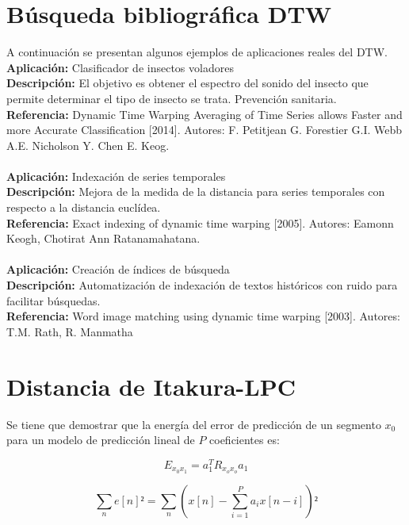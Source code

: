 \documentclass[12pt]{article}
\begin{document}
\pagebreak


\section{Búsqueda bibliográfica DTW}
A continuación se presentan algunos ejemplos de aplicaciones reales del DTW.\\

\textbf{Aplicación:} Clasificador de insectos voladores\\
\textbf{Descripción:} El objetivo es obtener el espectro del sonido del insecto que permite determinar el tipo de insecto se trata. Prevención sanitaria.\\
\textbf{Referencia:} Dynamic Time Warping Averaging of Time Series allows Faster and more Accurate Classification [2014]. Autores: F. Petitjean G. Forestier G.I. Webb A.E. Nicholson Y. Chen E. Keog.\\\\

\textbf{Aplicación:} Indexación de series temporales\\
\textbf{Descripción:} Mejora de la medida de la distancia para series temporales con respecto a la distancia euclídea.\\
\textbf{Referencia:} Exact indexing of dynamic time warping [2005]. Autores: Eamonn Keogh, Chotirat Ann Ratanamahatana.\\\\

\textbf{Aplicación:} Creación de índices de búsqueda\\
\textbf{Descripción:} Automatización de indexación de textos históricos con ruido para facilitar búsquedas.\\
\textbf{Referencia:} Word image matching using dynamic time warping [2003]. Autores: T.M. Rath, R. Manmatha\\


\section{Distancia de Itakura-LPC}
Se tiene que demostrar que la energía del error de predicción de un segmento $x_0$ para un modelo de predicción lineal de $P$ coeficientes es:

$$
E_{x_0x_1} = a_1^TR_{x_ox_o}a_1
$$


\begin{equation}
	\sum_{n}^{}e[n]² = \sum_{n}^{}(x[n]-\sum_{i=1}^{P}a_ix[n-i])²
\end{equation}
\end{document}
